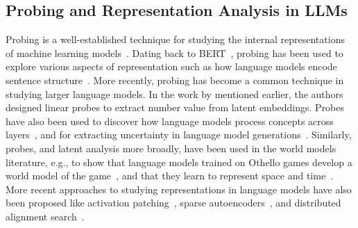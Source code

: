 \subsection{Probing and Representation Analysis in LLMs}
Probing is a well-established technique for studying the internal representations of machine learning models~\cite{alain2018understandingintermediatelayersusing,belinkov2021probingclassifierspromisesshortcomings}. Dating back to BERT~\cite{devlin2019bertpretrainingdeepbidirectional}, probing has been used to explore various aspects of representation such as how language models encode sentence structure~\cite{tenney2019you,manning2020emergent,bertology}. More recently, probing has become a common technique in studying larger language models. In the work by \citet{zhu-etal-2025-language} mentioned earlier, the authors designed linear probes to extract number value from latent embeddings. Probes have also been used to discover how language models process concepts across layers~\cite{gurnee2023finding}, and for extracting uncertainty in language model generations~\cite{kadavath2022language}. 
Similarly, probes, and latent analysis more broadly, have been used in the world models literature, e.g., to show that language models trained on Othello games develop a world model of the game~\cite{nanda-etal-2023-emergent}, and that they learn to represent space and time~\cite{gurnee2024languagemodelsrepresentspace,gurnee2023finding,nylund2023time}.
More recent approaches to studying representations in language models have also been proposed like activation patching~\cite{meng2022locating}, sparse autoencoders~\cite{cunningham2023sparse,gao2024scaling}, and distributed alignment search~\cite{geiger2024findingalignmentsinterpretablecausal}. 



